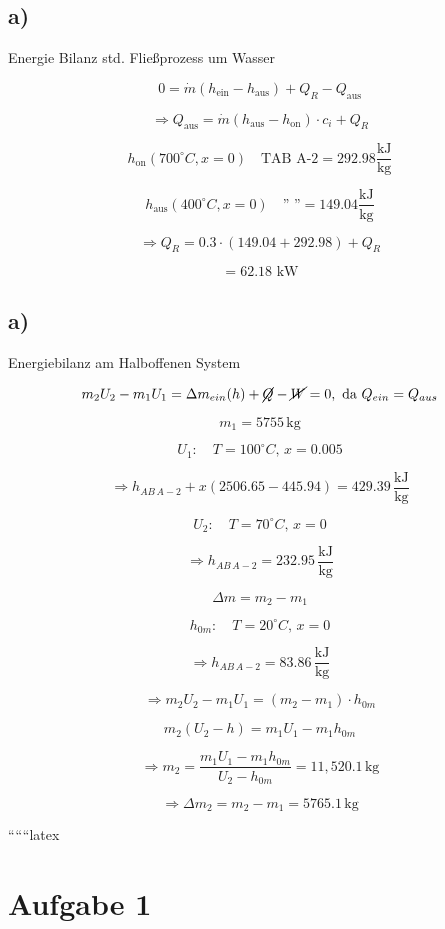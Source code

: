 

\subsection*{a)}
Energie Bilanz std. Fließprozess um Wasser

\[
0 = \dot{m} (h_{\text{ein}} - h_{\text{aus}}) + Q_R - Q_{\text{aus}}
\]

\[
\Rightarrow Q_{\text{aus}} = \dot{m} (h_{\text{aus}} - h_{\text{on}}) \cdot c_i + Q_R
\]

\[
h_{\text{on}} (700^\circ C, x=0) \quad \text{TAB A-2} = 292.98 \frac{\text{kJ}}{\text{kg}}
\]

\[
h_{\text{aus}} (400^\circ C, x=0) \quad \text{'' ''} = 149.04 \frac{\text{kJ}}{\text{kg}}
\]

\[
\Rightarrow Q_R = 0.3 \cdot (149.04 + 292.98) + Q_R
\]

\[
= 62.18 \text{ kW}
\]



\subsection*{a)}
Energiebilanz am Halboffenen System

\[
m_2 U_2 - m_1 U_1 = \Delta m_{ein} (h) + \cancel{Q} - \cancel{W} = 0, \text{ da } Q_{ein} = Q_{aus}
\]

\[
m_1 = 5755 \, \text{kg}
\]

\[
U_1: \quad T = 100^\circ C, \, x = 0.005
\]

\[
\Rightarrow h_{AB \, A-2} + x (2506.65 - 445.94) = 429.39 \, \frac{\text{kJ}}{\text{kg}}
\]

\[
U_2: \quad T = 70^\circ C, \, x = 0
\]

\[
\Rightarrow h_{AB \, A-2} = 232.95 \, \frac{\text{kJ}}{\text{kg}}
\]

\[
\Delta m = m_2 - m_1
\]

\[
h_{0m}: \quad T = 20^\circ C, \, x = 0
\]

\[
\Rightarrow h_{AB \, A-2} = 83.86 \, \frac{\text{kJ}}{\text{kg}}
\]

\[
\Rightarrow m_2 U_2 - m_1 U_1 = (m_2 - m_1) \cdot h_{0m}
\]

\[
m_2 (U_2 - h) = m_1 U_1 - m_1 h_{0m}
\]

\[
\Rightarrow m_2 = \frac{m_1 U_1 - m_1 h_{0m}}{U_2 - h_{0m}} = 11,520.1 \, \text{kg}
\]

\[
\Rightarrow \Delta m_2 = m_2 - m_1 = 5765.1 \, \text{kg}
\]

``````latex


\section*{Aufgabe 1}